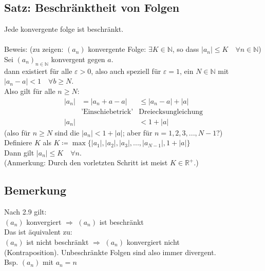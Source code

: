 \documentclass[12pt, titlepage]{article}
\newcommand{\R}{\mathds{R}}
\newcommand{\N}{\mathds{N}}
\renewcommand{\*}{\cdot}
\renewcommand{\epsilon}{\varepsilon}
\begin{document}
	\subsection{Satz: Beschränktheit von Folgen}
	Jede konvergente folge ist beschränkt.\\
	\\
	Beweis: (zu zeigen: $(a_n)$ konvergente Folge: $\exists K\in\N$, so dass $|a_n|\leq K\quad\forall n\in\N$)\\
	Sei $(a_n)_{n\in\N}$ konvergent gegen $a$.\\
	dann existiert für alle $\epsilon>0$, also auch speziell für $\epsilon=1$, ein $N\in\N$ mit $|a_n-a|<1\quad\forall b\geq N$.\\
	Also gilt für alle $n\geq N$:\\
	\begin{align*}
		|a_n|&=|a_n+a-a|&\leq |a_n-a|+|a|\\
		&\textrm{'Einschiebetrick'} &\textrm{Dreiecksungleichung}\\
		|a_n|&&<1+|a|
	\end{align*}
	(also für $n\geq N$ sind die $|a_n|<1+|a|$; aber für $n=1,2,3,..., N-1$?)\\
	Definiere $K$ als $K\coloneqq\max\{|a_1|,|a_2|,|a_3|,...,|a_{N-1}|,1+|a|\}$\\
	Dann gilt $|a_n|\leq K\quad\forall n$.\\
	(Anmerkung: Durch den vorletzten Schritt ist meist $K\in\R^+$.)\\
	\subsection{Bemerkung}
	Nach 2.9 gilt:\\
	 $(a_n)$ konvergiert $\Rightarrow$ $(a_n)$ ist beschränkt\\
	Das ist äquivalent zu:\\
	$(a_n)$ ist nicht beschränkt $\Rightarrow$ $(a_n)$ konvergiert nicht\\
	(Kontraposition). Unbeschränkte Folgen sind also immer divergent.\\
	Bsp. $(a_n)$ mit $a_n=n$
\end{document}
